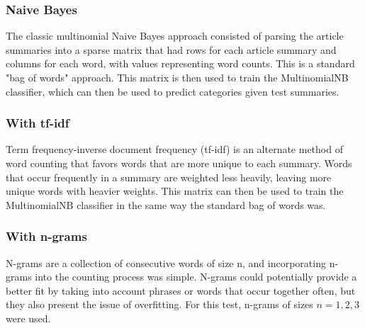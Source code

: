 \documentclass[]{article}
\begin{document}
\subsubsection*{Naive Bayes}
The classic multinomial Naive Bayes approach consisted of parsing the article summaries into a sparse matrix that had rows for each article summary and columns for each word, with values representing word counts. This is a standard "bag of words" approach. This matrix is then used to train the MultinomialNB classifier, which can then be used to predict categories given test summaries.
\subsubsection*{With tf-idf}
Term frequency-inverse document frequency (tf-idf) is an alternate method of word counting that favors words that are more unique to each summary. Words that occur frequently in a summary are weighted less heavily, leaving more unique words with heavier weights. This matrix can then be used to train the MultinomialNB classifier in the same way the standard bag of words was.
\subsubsection*{With n-grams}
N-grams are a collection of consecutive words of size n, and incorporating n-grams into the counting process was simple. N-grams could potentially provide a better fit by taking into account phrases or words that occur together often, but they also present the issue of overfitting. For this test, n-grams of sizes $n=1,2,3$ were used.
\end{document}
